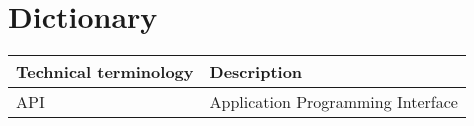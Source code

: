 \section{Dictionary} \label{app:dictionary}

\begin{table}[H]
\centering
\begin{tabular}{|l|l|}
\hline
Technical terminology & Description\\ \hline
API & Application Programming Interface\\ \hline


\end{tabular}
\end{table}